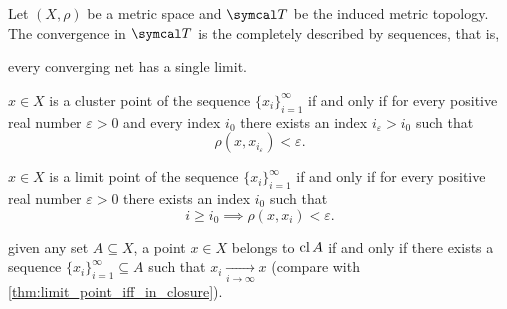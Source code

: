 \begin{proposition}\label{thm:metric_topology_convergence}
  Let \( (X, \rho) \) be a metric space and \( \Cal{T} \) be the induced metric topology. The convergence in \( \Cal{T} \) is the completely described by sequences, that is,

  \begin{defenum}
     every converging net has a single limit.

     \( x \in X \) is a cluster point of the sequence \( \{ x_i \}_{i=1}^\infty \) if and only if for every positive real number \( \varepsilon > 0 \) and every index \( i_0 \) there exists an index \( i_\varepsilon > i_0 \) such that
    \begin{equation*}
      \rho(x, x_{i_\varepsilon}) < \varepsilon.
    \end{equation*}

     \( x \in X \) is a limit point of the sequence \( \{ x_i \}_{i=1}^\infty \) if and only if for every positive real number \( \varepsilon > 0 \) there exists an index \( i_0 \) such that
    \begin{equation*}
      i \geq i_0 \implies \rho(x, x_i) < \varepsilon.
    \end{equation*}

     given any set \( A \subseteq X \), a point \( x \in X \) belongs to \( \operatorname{cl}{A} \) if and only if there exists a sequence \( \{ x_i \}_{i=1}^\infty \subseteq A \) such that \( x_i \xrightarrow[i \to \infty]{} x \) (compare with \cref{thm:limit_point_iff_in_closure}).
  \end{defenum}
\end{proposition}
